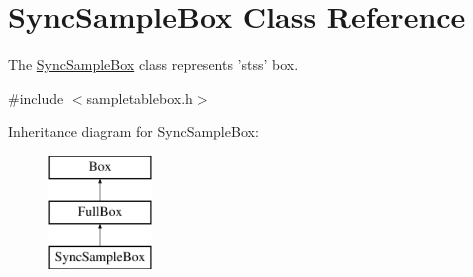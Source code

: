 \hypertarget{class_sync_sample_box}{\section{Sync\-Sample\-Box Class Reference}
\label{class_sync_sample_box}
}


The \hyperlink{class_sync_sample_box}{Sync\-Sample\-Box} class represents 'stss' box.  




{\ttfamily \#include $<$sampletablebox.\-h$>$}

Inheritance diagram for Sync\-Sample\-Box\-:\begin{figure}[H]
\begin{center}
\leavevmode
\includegraphics[height=3.000000cm]{class_sync_sample_box}
\end{center}
\end{figure}
